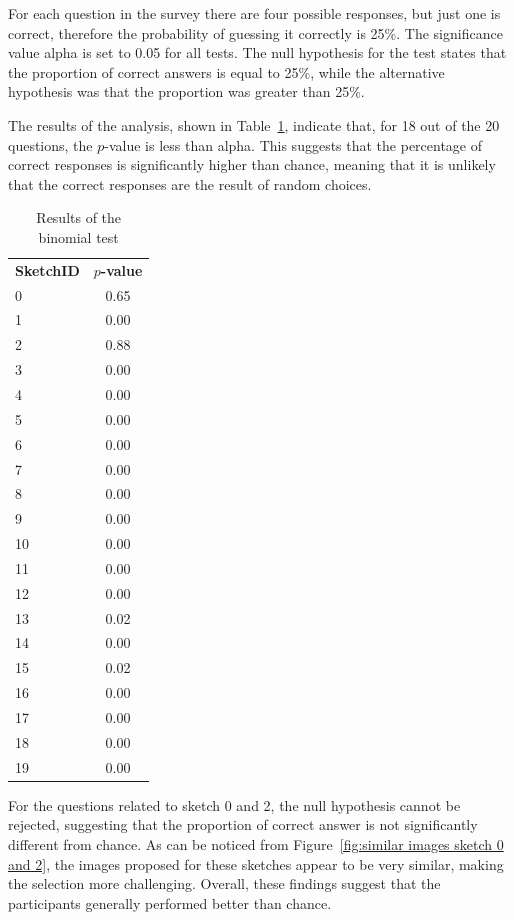 \noindent For each question in the survey there are four possible responses, but just one is correct, therefore the probability of guessing it correctly is \num{25}\%.
The significance value alpha is set to \num{0.05} for all tests. The null hypothesis for the test states that the proportion of correct answers is equal to \num{25}\%, while the alternative hypothesis was that the proportion was greater than \num{25}\%.

\noindent The results of the analysis, shown in Table~\ref{tab:binomial test results}, indicate that, for \num{18} out of the \num{20} questions, the $p$-value is less than alpha. This suggests that the percentage of correct responses is significantly higher than chance, meaning that it is unlikely that the correct responses are the result of random choices.
%
\begin{table}[!ht]
\begin{center}
    \begin{tabular}{lc}
    \textbf{SketchID} & \textbf{$p$-value}  \\
    0 & 0.65 \\
    1 & 0.00 \\
    2 & 0.88 \\
    3 & 0.00 \\
    4 & 0.00 \\
    5 & 0.00 \\
    6 & 0.00 \\
    7 & 0.00 \\
    8 & 0.00 \\
    9 & 0.00 \\
    10 & 0.00 \\
    11 & 0.00 \\
    12 & 0.00 \\
    13 & 0.02 \\
    14 & 0.00 \\
    15 & 0.02 \\
    16 & 0.00 \\
    17 & 0.00 \\
    18 & 0.00 \\
    19 & 0.00 \\
    \end{tabular}
     \caption{\label{tab:binomial test results}Results of the binomial test}
\end{center}
\end{table}

\noindent For the questions related to sketch \num{0} and \num{2}, the null hypothesis cannot be rejected, suggesting that the proportion of correct answer is not significantly different from chance. As can be noticed from Figure~\ref{fig:similar images sketch 0 and 2}, the images proposed for these sketches appear to be very similar, making the selection more challenging.
Overall, these findings suggest that the participants generally performed better than chance.

